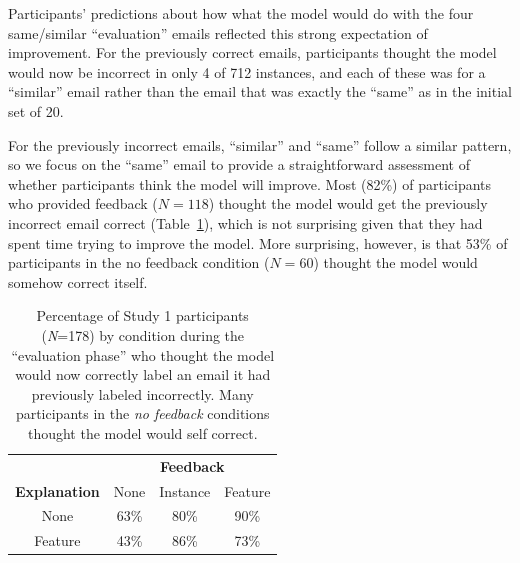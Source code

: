 
Participants' predictions about how what the model would do with the four same/similar ``evaluation'' emails  reflected this strong expectation of improvement. 
For the previously correct emails, participants thought the model would now be incorrect in only 4 of 712 instances, and each of these was for a ``similar'' email rather than the email that was exactly the ``same'' as in the initial set of 20.

For the previously incorrect emails, ``similar'' and ``same'' follow a similar pattern, so we focus on the ``same'' email to provide a straightforward assessment of whether participants think the model will improve. 
%
Most (82\%) of participants who provided feedback ($N=118$) thought the model would get the previously incorrect email correct (Table~\ref{tab:study1eval}), which is not surprising given that they had spent time trying to improve the model.
%
More surprising, however, is that 53\% of  participants in the no feedback condition ($N=60$) thought the model would somehow correct itself. %

\begin{table}[t]
    \centering
    \begin{tabular}{cccc}
    \toprule
              & \multicolumn{3}{c}{{\bf Feedback}} \\
              \cline{2-4}
        {\bf Explanation} & None & Instance & Feature \\
         \midrule
        None & 63\% & 80\% & 90\% \\
        Feature & 43\% & 86\% & 73\% \\
        \bottomrule
    \end{tabular}
    \caption{Percentage of Study 1 participants (\textit{N}=178) by condition during the ``evaluation phase'' who thought the model would now correctly label an email it had previously labeled incorrectly. Many participants in the \textit{no feedback} conditions thought the model would self correct.}
    \label{tab:study1eval}
    \vspace{-15pt}
\end{table}

